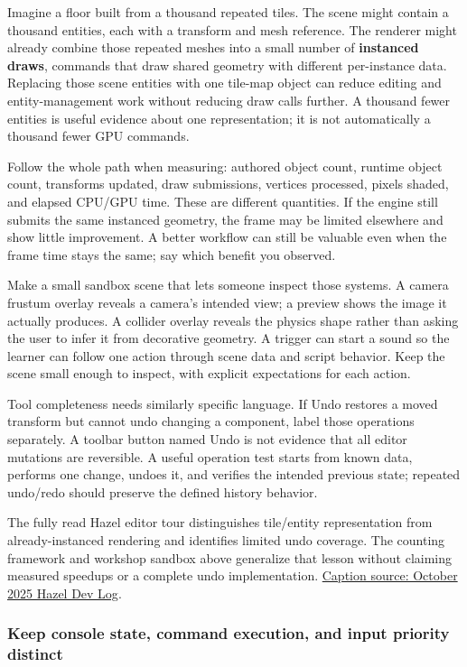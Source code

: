 Imagine a floor built from a thousand repeated tiles. The scene might contain a thousand entities, each with a transform and mesh reference. The renderer might already combine those repeated meshes into a small number of \textbf{instanced draws}, commands that draw shared geometry with different per-instance data. Replacing those scene entities with one tile-map object can reduce editing and entity-management work without reducing draw calls further. A thousand fewer entities is useful evidence about one representation; it is not automatically a thousand fewer GPU commands.

Follow the whole path when measuring: authored object count, runtime object count, transforms updated, draw submissions, vertices processed, pixels shaded, and elapsed CPU/GPU time. These are different quantities. If the engine still submits the same instanced geometry, the frame may be limited elsewhere and show little improvement. A better workflow can still be valuable even when the frame time stays the same; say which benefit you observed.

Make a small sandbox scene that lets someone inspect those systems. A camera frustum overlay reveals a camera's intended view; a preview shows the image it actually produces. A collider overlay reveals the physics shape rather than asking the user to infer it from decorative geometry. A trigger can start a sound so the learner can follow one action through scene data and script behavior. Keep the scene small enough to inspect, with explicit expectations for each action.

Tool completeness needs similarly specific language. If Undo restores a moved transform but cannot undo changing a component, label those operations separately. A toolbar button named Undo is not evidence that all editor mutations are reversible. A useful operation test starts from known data, performs one change, undoes it, and verifies the intended previous state; repeated undo/redo should preserve the defined history behavior.

The fully read Hazel editor tour distinguishes tile/entity representation from already-instanced rendering and identifies limited undo coverage. The counting framework and workshop sandbox above generalize that lesson without claiming measured speedups or a complete undo implementation. \href{https://www.youtube.com/watch?v=-XT9R2P3I7M}{Caption source: October 2025 Hazel Dev Log}.

\subsubsection{Keep console state, command execution, and input priority distinct}\label{06-engine-ii-ch032-keep-console-state-command-execution-and-input-priority-distinct}

